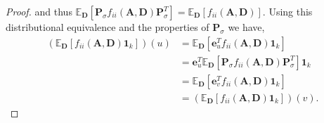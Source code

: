 \documentclass[journal,draftcls,onecolumn]{IEEEtran}
\theoremstyle{mystyle}
\newcommand{\bfD}{\mathbf{D}}
\begin{document}
\begin{proof}
and thus $\mathbb{E}_{\bfD}[\mathbf{P}_{\sigma} f_{ii}( \mathbf{A}, \mathbf{D}) \mathbf{P}_{\sigma}^T] = \mathbb{E}_{\bfD}[f_{ii}( \mathbf{A}, \mathbf{D})]$. Using this distributional equivalence and the properties of $\mathbf{P}_\sigma$ we have,
\begin{align*}
(\mathbb{E}_{\mathbf{D}} [f_{ii}( \mathbf{A}, \mathbf{D}) \mathbf{1}_k ])(u) 
& = \mathbb{E}_{\mathbf{D}}[\mathbf{e}_u^T f_{ii}( \mathbf{A}, \mathbf{D}) \mathbf{1}_k]\\
& = \mathbf{e}_u^T  \mathbb{E}_{\mathbf{D}}[\mathbf{P}_{\sigma}f_{ii}( \mathbf{A}, \mathbf{D}) \mathbf{P}_{\sigma}^T] \mathbf{1}_k\\
& = \mathbb{E}_{\mathbf{D}}[ \mathbf{e}_v^Tf_{ii}( \mathbf{A}, \mathbf{D}) \mathbf{1}_k]\\
& = (\mathbb{E}_{\mathbf{D}} [f_{ii}( \mathbf{A}, \mathbf{D}) \mathbf{1}_k ])(v).
\end{align*}







\end{proof}
\end{document}
